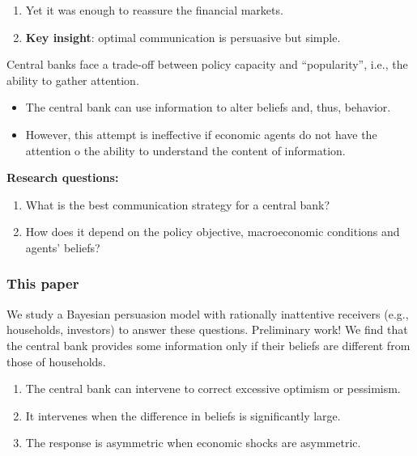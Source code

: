 \documentclass{beamer}
\begin{document}
\begin{frame}[allowframebreaks]
\begin{enumerate}
    \item Yet it was enough to reassure the financial markets.
    \item \textbf{Key insight}: optimal communication is persuasive but simple.
\end{enumerate}
\framebreak
Central banks face a trade-off between policy capacity and ``popularity'', i.e., the ability to gather attention. 
\begin{itemize}
    \item The central bank can use information to alter beliefs and, thus, behavior.
    \item However, this attempt is ineffective if economic agents do not have the attention o the ability to understand the content of information.
\end{itemize}
\vskip10pt
\textbf{Research questions:}
\begin{enumerate}
    \item What is the best communication strategy for a central bank?
    \item How does it depend on the policy objective, macroeconomic conditions and agents' beliefs?
\end{enumerate}
\end{frame}

\begin{frame}
\frametitle{This paper}
We study a Bayesian persuasion model with rationally inattentive receivers (e.g., households, investors) to answer these questions. 
\vskip10pt 
Preliminary work!
\vskip10pt
We find that the central bank provides some information only if their beliefs are different from those of households. 
\begin{enumerate}
    \item The central bank can intervene to correct excessive optimism or pessimism.
    \item It intervenes when the difference in beliefs is significantly large.
    \item The response is asymmetric when economic shocks are asymmetric.
\end{enumerate}

\end{frame}
\end{document}
